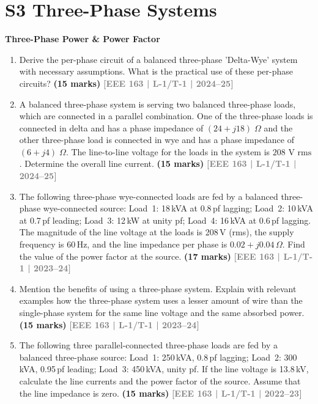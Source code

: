 \documentclass[12pt,a3paper]{article}
\newcommand{\yr}[1]{\hfill\textcolor{gray}{\small\textbf{[#1]}}}
\newcommand{\mk}[1]{\textcolor{orange!70!black}{\small\textbf{(#1 marks)}}}
\newcommand{\subtopic}[2]{%
  \vspace{10pt}
  \noindent\begin{tcolorbox}[colback=#1!8,colframe=#1,boxrule=0.6pt,arc=4pt,
    left=6pt,right=6pt,top=4pt,bottom=4pt]
    \small\bfseries\textcolor{#1}{#2}
  \end{tcolorbox}
  \vspace{2pt}
}
\begin{document}
\section*{S3 \quad Three-Phase Systems}

\subtopic{cC}{Three-Phase Power \& Power Factor}
\label{sub:s3-threephasepower}

\begin{enumerate}

\item Derive the per-phase circuit of a balanced three-phase 'Delta-Wye' system with 
necessary assumptions. What is the practical use of these per-phase circuits?
\mk{15} \yr{EEE 163 | L-1/T-1 | 2024--25}  

\item A balanced three-phase system is serving two balanced three-phase loads, which 
are connected in a parallel combination. One of the three-phase loads is connected in 
delta and has a phase impedance of $(24 + j18) \; \Omega$ and the other three-phase load is 
connected in wye and has a phase impedance of $(6 + j4) \; \Omega$. The line-to-line voltage 
for the loads in the system is $208 \text{ V rms}$. Determine the overall line current.
\mk{15} \yr{EEE 163 | L-1/T-1 | 2024--25}

  \item The following three-phase wye-connected loads are fed by a balanced three-phase wye-connected source: Load~1: 18\,kVA at 0.8\,pf lagging; Load~2: 10\,kVA at 0.7\,pf leading; Load~3: 12\,kW at unity pf; Load~4: 16\,kVA at 0.6\,pf lagging. The magnitude of the line voltage at the loads is 208\,V (rms), the supply frequency is 60\,Hz, and the line impedance per phase is $0.02 + j0.04\,\Omega$. Find the value of the power factor at the source.
\mk{17} \yr{EEE 163 | L-1/T-1 | 2023--24}

\item Mention the benefits of using a three-phase system. Explain with relevant examples how the three-phase system uses a lesser amount of wire than the single-phase system for the same line voltage and the same absorbed power.
\mk{15} \yr{EEE 163 | L-1/T-1 | 2023--24}

\item The following three parallel-connected three-phase loads are fed by a balanced three-phase source: Load~1: 250\,kVA, 0.8\,pf lagging; Load~2: 300\,kVA, 0.95\,pf leading; Load~3: 450\,kVA, unity pf. If the line voltage is 13.8\,kV, calculate the line currents and the power factor of the source. Assume that the line impedance is zero.
\mk{15} \yr{EEE 163 | L-1/T-1 | 2022--23}


\end{enumerate}
\end{document}
